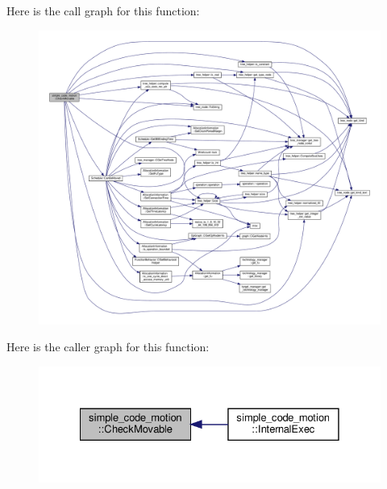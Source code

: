 Here is the call graph for this function\+:
\nopagebreak
\begin{figure}[H]
\begin{center}
\leavevmode
\includegraphics[width=350pt]{d5/d58/classsimple__code__motion_a69d1855a3f8ec2bcb43e9d63bc923961_cgraph}
\end{center}
\end{figure}
Here is the caller graph for this function\+:
\nopagebreak
\begin{figure}[H]
\begin{center}
\leavevmode
\includegraphics[width=328pt]{d5/d58/classsimple__code__motion_a69d1855a3f8ec2bcb43e9d63bc923961_icgraph}
\end{center}
\end{figure}
\mbox{\label{classsimple__code__motion_a2d0ecf0878e4d4c20f186b0096faf490}} 
